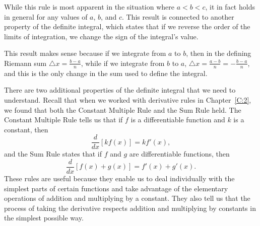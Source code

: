 \noindent While this rule is most apparent in the situation where $a < b < c$, it in fact holds in general for any values of $a$, $b$, and $c$.  This result is connected to another property of the definite integral, which states that if we reverse the order of the limits of integration, we change the sign of the integral's value.

\vspace*{5pt}
\nin {}
\vspace*{1pt}

\noindent This result makes sense because if we integrate from $a$ to $b$, then in the defining Riemann sum $\triangle x = \frac{b-a}{n}$, while if we integrate from $b$ to $a$, $\triangle x = \frac{a-b}{n} = -\frac{b-a}{n}$, and this is the only change in the sum used to define the integral.

There are two additional properties of the definite integral that we need to understand.  Recall that when we worked with derivative rules in Chapter~\ref{C:2}, we found that both the Constant Multiple Rule and the Sum Rule held.  The Constant Multiple Rule tells us that if $f$ is a differentiable function and $k$ is a constant, then
$$\frac{d}{dx} [kf(x)] = kf'(x),$$
and the Sum Rule states that if $f$ and $g$ are differentiable functions, then
$$\frac{d}{dx}[f(x) + g(x)] = f'(x) + g'(x).$$
These rules are useful because they enable us to deal individually with the simplest parts of certain functions and take advantage of the elementary operations of addition and multiplying by a constant.  They also tell us that the process of taking the derivative respects addition and multiplying by constants in the simplest possible way.  

